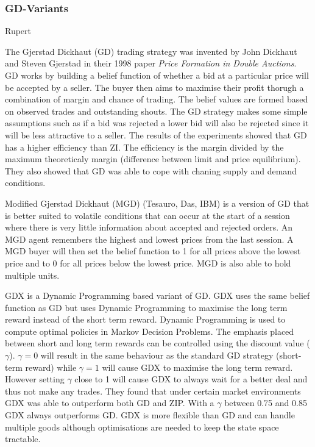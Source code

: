 \documentclass{acm_proc_article-sp}
\begin{document}
\subsubsection{GD-Variants} \label{sec:traders_GDV}
Rupert

The Gjerstad Dickhaut (GD) trading strategy was invented by John Dickhaut and
Steven Gjerstad in their 1998 paper \emph{Price Formation in Double Auctions}.
GD works by building a belief function of whether a bid at a particular price
will be accepted by a seller.
The buyer then aims to maximise their profit thorugh a combination of margin
and chance of trading.
The belief values are formed based on observed trades and outstanding shouts.
The GD strategy makes some simple assumptions such as if a bid was rejected a
lower bid will also be rejected since it will be less attractive to a seller.
The results of the experiments showed that GD has a higher efficiency than ZI.
The efficiency is the margin divided by the maximum theoreticaly margin
(difference between limit and price equilibrium).
They also showed that GD was able to cope with chaning supply and demand
conditions.

Modified Gjerstad Dickhaut (MGD) (Tesauro, Das, IBM)  is a version of GD that
is better suited to volatile conditions that can occur at the start of a
session where there is very little information about accepted and rejected
orders.
An MGD agent remembers the highest and lowest prices from the last session.
A MGD buyer will then set the belief function to 1 for all prices above the
lowest price and to 0 for all prices below the lowest price.
MGD is also able to hold multiple units.


GDX is a Dynamic Programming based variant of GD.
GDX uses the same belief function as GD but uses Dynamic Programming to
maximise the long term reward instead of the short term reward.
Dynamic Programming is used to compute optimal policies in Markov Decision
Problems.
The emphasis placed between short and long term rewards can be controlled using
the discount value ($\gamma$).
$\gamma = 0$ will result in the same behaviour as the standard GD strategy
(short-term reward) while $\gamma = 1$ will cause GDX to maximise the long term
reward.
However setting $\gamma$ close to 1 will cause GDX to always wait for a better
deal and thus not make any trades.
They found that under certain market environments GDX was able to outperform
both GD and ZIP.
With a $\gamma$ between 0.75 and 0.85 GDX always outperforms GD.
GDX is more flexible than GD and can handle multiple goods although
optimisations are needed to keep the state space tractable.
\end{document}
